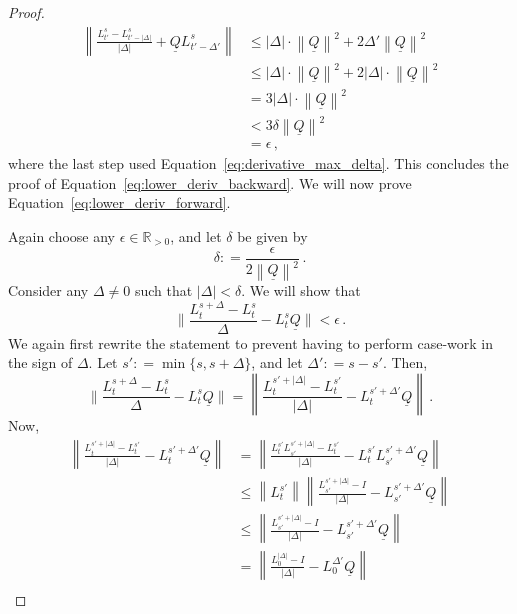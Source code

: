 \documentclass[10pt]{paper}
\newcommand{\reals}{\mathbb{R}}
\newcommand{\realspos}{\reals_{>0}}
\newcommand{\lbound}{L}
\newcommand{\lrate}{\underline{Q}}
\newcommand{\norm}[1]{\left\lVert #1 \right\rVert}
\newcommand{\coloneqq}{:\!=}
\begin{document}
\begin{proof}
\begin{align*}
\norm{\frac{L_{t'}^s - L_{t'-\lvert\Delta\rvert}^s}{\lvert\Delta\rvert}+\lrate L_{t'-\Delta'}^s} &\leq \lvert\Delta\rvert\cdot\norm{\lrate}^2 + 2\Delta'\norm{\lrate}^2 \\
 &\leq \lvert\Delta\rvert\cdot\norm{\lrate}^2 + 2\lvert\Delta\rvert\cdot\norm{\lrate}^2 \\
 &= 3\lvert\Delta\rvert\cdot\norm{\lrate}^2 \\
 &< 3\delta\norm{\lrate}^2 \\
 &= \epsilon\,,
\end{align*}
where the last step used Equation~\eqref{eq:derivative_max_delta}. This concludes the proof of Equation~\eqref{eq:lower_deriv_backward}. We will now prove Equation~\eqref{eq:lower_deriv_forward}.

Again choose any $\epsilon\in\realspos$, and let $\delta$ be given by
\begin{equation*}
\delta \coloneqq \frac{\epsilon}{2\norm{\lrate}^2}\,.
\end{equation*}
Consider any $\Delta\neq 0$ such that $\lvert\Delta\rvert<\delta$. We will show that
\begin{equation*}
\Big\lVert\frac{L_{t}^{s+\Delta}-L_t^s}{\Delta}-\lbound_t^s\lrate \Big\rVert<\epsilon\,.
\end{equation*}
We again first rewrite the statement to prevent having to perform case-work in the sign of $\Delta$. Let $s'\coloneqq\min\{s,s+\Delta\}$, and let $\Delta'\coloneqq s-s'$. Then,
\begin{equation*}
\Big\lVert\frac{L_{t}^{s+\Delta}-L_t^s}{\Delta}-\lbound_t^s\lrate \Big\rVert = \norm{\frac{L_t^{s'+\lvert\Delta\rvert} - L_t^{s'}}{\lvert\Delta\rvert} - L_t^{s'+\Delta'}\lrate}\,.
\end{equation*}
Now,
\begin{align*}
\norm{\frac{L_t^{s'+\lvert\Delta\rvert} - L_t^{s'}}{\lvert\Delta\rvert} - L_t^{s'+\Delta'}\lrate} &= \norm{\frac{L_t^{s'}L_{s'}^{s'+\lvert\Delta\rvert} - L_t^{s'}}{\lvert\Delta\rvert} - L_t^{s'}L_{s'}^{s'+\Delta'}\lrate} \\
 &\leq \norm{L_t^{s'}}\norm{\frac{L_{s'}^{s'+\lvert\Delta\rvert} - I}{\lvert\Delta\rvert} - L_{s'}^{s'+\Delta'}\lrate} \\
 &\leq \norm{\frac{L_{s'}^{s'+\lvert\Delta\rvert} - I}{\lvert\Delta\rvert} - L_{s'}^{s'+\Delta'}\lrate} \\
 &= \norm{\frac{L_{0}^{\lvert\Delta\rvert} - I}{\lvert\Delta\rvert} - L_{0}^{\Delta'}\lrate} \\

\end{align*}
\end{proof}
\end{document}
